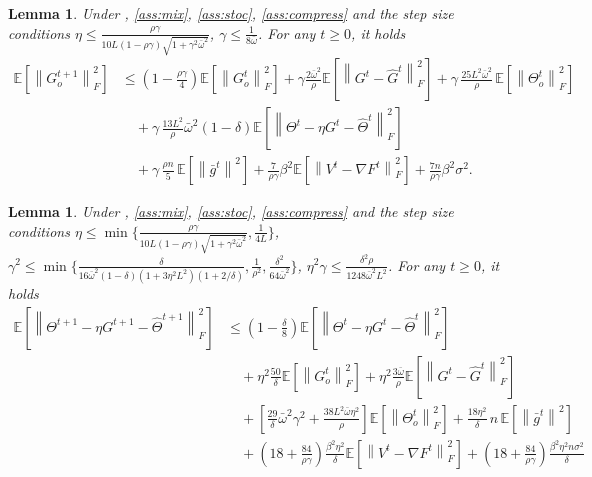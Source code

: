 \documentclass[10pt]{article} %
\theoremstyle{plain}
\newtheorem{lemma}[theorem]{Lemma}
\theoremstyle{definition}
\theoremstyle{remark}
\newcommand{\grdF}{\nabla F}
\newcommand{\bw}{\bar{\omega}}
\newcommand{\avgg}{\bar{g}}
\newcommand{\norm}[1]{\left\| #1 \right\|}
\newcommand{\nl}{\nonumber\\}
\newcommand{\hatTheta}{\widehat{\Theta}}
\newcommand{\hatG}{\widehat{G}}
\begin{document}
\begin{lemma}\label{lem:gt_new} Under , \ref{ass:mix}, \ref{ass:stoc}, \ref{ass:compress} and the step size conditions $\eta \leq \frac{ \rho \gamma }{ 10 L (1-\rho\gamma) \sqrt{1 + \gamma^2 \bw^2} }$, $\gamma \leq \frac{1}{8 \bw}$. For any $t \geq 0$, it holds
    \begin{align*}
    \mathbb{E} \left[ \norm{G_o^{t+1}}_F^2 \right] & \leq \left( 1 - \frac{ \rho \gamma }{4} \right) \mathbb{E} \left[ \norm{ G_o^t }_F^2 \right] + \gamma \frac{ 2 \bw^2}{ \rho } \mathbb{E} \left[ \norm{ G^t - \hatG^t }_F^2 \right] + \gamma \, \frac{25 L^2 \bw^2}{\rho} \, \mathbb{E} \left[ \norm{ \Theta_o^t}_F^2 \right] \nl 
    & \quad + \gamma \, \frac{13 L^2}{ \rho } \bw^2 (1 - \delta) \mathbb{E} \left[ \norm{ \Theta^t - \eta G^t - \hatTheta^t }_F^2 \right] \nl 
    & \quad + \gamma \, \frac{ \rho n}{5} \, \mathbb{E} \left[ \norm{ \avgg^t }^2 \right] + \frac{7}{ \rho \gamma } \beta^2 \mathbb{E} \left[ \norm{V^t - \grdF^t}_F^2 \right] + \frac{7n }{\rho \gamma} \beta^2 \sigma^2 .
    \end{align*}
\end{lemma}
\begin{lemma} \label{lem:thetahat_new} Under , \ref{ass:mix}, \ref{ass:stoc}, \ref{ass:compress} and the step size conditions $\eta \leq \min \{ \frac{ \rho \gamma }{ 10 L (1-\rho\gamma) \sqrt{1 + \gamma^2 \bw^2} },  \frac{1}{4L} \}$,
$\gamma^2 \leq \min \{\frac{\delta}{ 16 \bw^2 (1-\delta) (1 + 3\eta^2 L^2) (1 + 2/\delta)}, \frac{1}{\rho^2}, \frac{\delta^2}{64\bw^2}\}$, $\eta^2 \gamma \leq \frac{\delta^2 \rho}{1248 \bw^2 L^2}$. For any $t \geq 0$, it holds
    \begin{align}
    \mathbb{E} \left[ \norm{\Theta^{t+1}- \eta G^{t+1}- \hatTheta^{t+1}}_F^2 \right] & \leq \left(1-\frac{\delta}{8} \right) \mathbb{E} \left[ \norm{\Theta^t - \eta G^t - \hatTheta^t}_F^2 \right] \nl 
        & \quad + \eta^2 \frac{50}{\delta} \mathbb{E} \left[ \norm{G_o^t}_F^2 \right] + \eta^2 \frac{3 \bw}{\rho} \mathbb{E} \left[ \norm{G^{t} - \hatG^t}_F^2 \right] \nl 
        & \quad + \left[ \frac{29}{\delta} \bw^2 \gamma^2 + \frac{38 L^2 \bw \eta^2}{\rho} \right] \mathbb{E} \left[ \norm{\Theta_o^t}_F^2 \right] + \frac{18 \eta^2}{\delta} \, n \, \mathbb{E}  \left[ \norm{ \avgg^t }^2 \right] \nl 
        & \quad + \left( 18 + \frac{84}{\rho\gamma} \right)\frac{ \beta^2\eta^2 }{\delta} \mathbb{E} \left[ \norm{ V^t - \grdF^t }_F^2 \right] + \left( 18 + \frac{84}{\rho \gamma} \right) \frac{\beta^2 \eta^2 n\sigma^2}{\delta} 
    \end{align}
\end{lemma}
\end{document}
